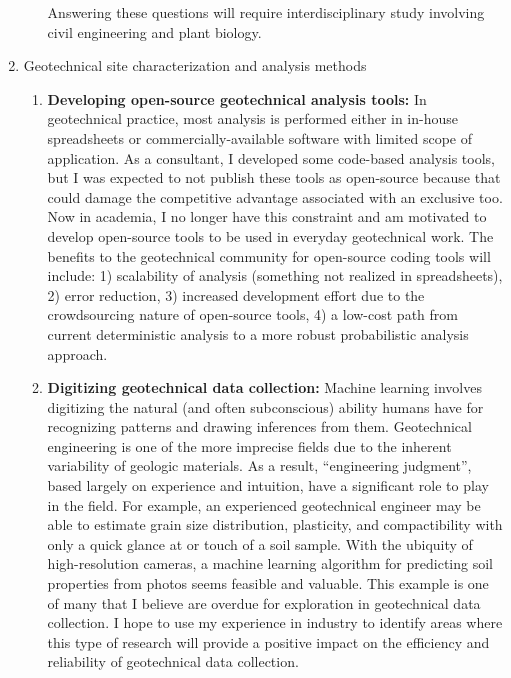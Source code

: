 \documentclass[10pt,letterpaper]{article}
\begin{document}
\begin{enumerate}
\begin{enumerate}
Answering these questions will require interdisciplinary study involving civil engineering and plant biology.
\end{enumerate}
\item Geotechnical site characterization and analysis methods
\begin{enumerate}
\item \textbf{Developing open-source geotechnical analysis tools:} In geotechnical practice, most analysis is performed either in in-house spreadsheets or commercially-available software with limited scope of application.
As a consultant, I developed some code-based analysis tools, but I was expected to not publish these tools as open-source because that could damage the competitive advantage associated with an exclusive too.
Now in academia, I no longer have this constraint and am motivated to develop open-source tools to be used in everyday geotechnical work.
The benefits to the geotechnical community for open-source coding tools will include:
1) scalability of analysis (something not realized in spreadsheets),
2) error reduction,
3) increased development effort due to the crowdsourcing nature of open-source tools,
4) a low-cost path from current deterministic analysis to a more robust probabilistic analysis approach.
\item \textbf{Digitizing geotechnical data collection:} Machine learning involves digitizing the natural (and often subconscious) ability humans have for recognizing patterns and drawing inferences from them.
Geotechnical engineering is one of the more imprecise fields due to the inherent variability of geologic materials.
As a result, ``engineering judgment'', based largely on experience and intuition, have a significant role to play in the field.
For example, an experienced geotechnical engineer may be able to estimate grain size distribution, plasticity, and compactibility with only a quick glance at or touch of a soil sample.
With the ubiquity of high-resolution cameras, a machine learning algorithm for predicting soil properties from photos seems feasible and valuable.
This example is one of many that I believe are overdue for exploration in geotechnical data collection.
I hope to use my experience in industry to identify areas where this type of research will provide a positive impact on the efficiency and reliability of geotechnical data collection.
\end{enumerate}
\end{enumerate}
\end{document}
